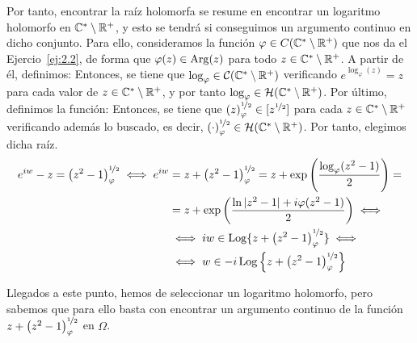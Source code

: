 \begin{ejercicio}
    Por tanto, encontrar la raíz holomorfa se resume en encontrar un logaritmo holomorfo en $\mathbb{C}^*\setminus\mathbb{R}^+$, y esto se tendrá si conseguimos un argumento continuo en dicho conjunto. Para ello, consideramos la función $\varphi\in C(\mathbb{C}^*\setminus \mathbb{R}^+)$ que nos da el Ejercio~\ref{ej:2.2}, de forma que $\varphi(z)\in \operatorname{Arg}(z)$ para todo $z\in \mathbb{C}^*\setminus \mathbb{R}^+$. A partir de él, definimos:
    Entonces, se tiene que $\log_{\varphi}\in \mathcal{C}(\mathbb{C}^*\setminus \mathbb{R}^+)$ verificando $e^{\log_\varphi(z)}=z$ para cada valor de $z\in \mathbb{C}^*\setminus \mathbb{R}^+$, y por tanto $\log_{\varphi}\in \mathcal{H}(\mathbb{C}^*\setminus \mathbb{R}^+)$. Por último, definimos la función:
    Entonces, se tiene que $\left(z\right)^{\nicefrac{1}{2}}_{\varphi}\in [z^{\nicefrac{1}{2}}]$ para cada $z\in \mathbb{C}^*\setminus \mathbb{R}^+$ verificando además lo buscado, es decir, $\left(\cdot\right)^{\nicefrac{1}{2}}_{\varphi}\in \mathcal{H}(\mathbb{C}^*\setminus \mathbb{R}^+)$. Por tanto, elegimos dicha raíz.
    \begin{align*}
        e^{iw} -z = \left(z^2-1\right)^{\nicefrac{1}{2}}_{\varphi}
        \iff e^{iw} &= z + \left(z^2-1\right)^{\nicefrac{1}{2}}_{\varphi}
        = z+\exp\left(\frac{\log_{\varphi}(z^2-1)}{2}\right)
        =\\&= z+\exp\left(\frac{\ln |z^2-1| + i\varphi(z^2-1)}{2}\right)
        \iff \\&\iff iw\in \operatorname{Log}\{z + \left(z^2-1\right)^{\nicefrac{1}{2}}_{\varphi}\}
        \iff\\&\iff w\in -i\operatorname{Log}\left\{z + \left(z^2-1\right)^{\nicefrac{1}{2}}_{\varphi}\right\}
    \end{align*}

    Llegados a este punto, hemos de seleccionar un logaritmo holomorfo, pero sabemos que para ello basta con encontrar un argumento continuo de la función $z + \left(z^2-1\right)^{\nicefrac{1}{2}}_{\varphi}$ en $\Omega$.\\



    \begin{comment}
     = \{\pm (z^2-1)^{\nicefrac{1}{2}}\}
        \iff\\&\iff e^{iw} = z \pm (z^2-1)^{\nicefrac{1}{2}}
        \iff iw\in \Log\left(z \pm (z^2-1)^{\nicefrac{1}{2}}\right)
        \iff\\&\iff w\in -i\Log\left(z \pm (z^2-1)^{\nicefrac{1}{2}}\right)
    


\end{comment}
\end{ejercicio}
